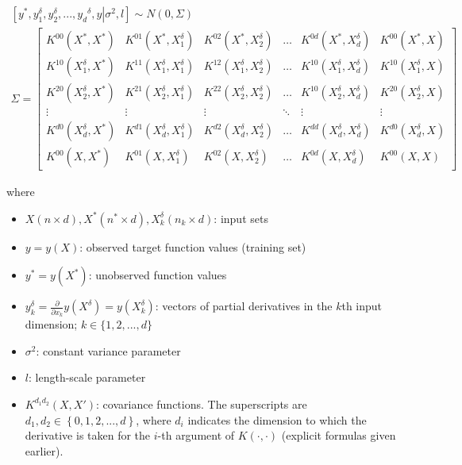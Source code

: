 \documentclass{sfuthesis}
\begin{document}
  \begin{gather}
\left[ {{y^*},y_1^\delta ,y_2^\delta ,...,{y_d}^\delta ,y\left| {{\sigma ^2},l} \right.} \right]\sim N\left( {0,\Sigma } \right) \\
\Sigma  = \left[ {\begin{array}{*{20}{c}}
{{K^{00}}\left( {{X^*},{X^*}} \right)}&{{K^{01}}\left( {{X^*},X_1^\delta } \right)}&{{K^{02}}\left( {{X^*},X_2^\delta } \right)}& \ldots &{{K^{0d}}\left( {{X^*},X_d^\delta } \right)}&{{K^{00}}\left( {{X^*},X} \right)}\\
{{K^{10}}\left( {X_1^\delta ,{X^*}} \right)}&{{K^{11}}\left( {X_1^\delta ,X_1^\delta } \right)}&{{K^{12}}\left( {X_1^\delta ,X_2^\delta } \right)}& \ldots &{{K^{10}}\left( {X_1^\delta ,X_d^\delta } \right)}&{{K^{10}}\left( {X_1^\delta ,X} \right)}\\
{{K^{20}}\left( {X_2^\delta ,{X^*}} \right)}&{{K^{21}}\left( {X_2^\delta ,X_1^\delta } \right)}&{{K^{22}}\left( {X_2^\delta ,X_2^\delta } \right)}& \ldots &{{K^{10}}\left( {X_2^\delta ,X_d^\delta } \right)}&{{K^{20}}\left( {X_2^\delta ,X} \right)}\\
 \vdots & \vdots & \vdots & \ddots & \vdots & \vdots \\
{{K^{d0}}\left( {X_d^\delta ,{X^*}} \right)}&{{K^{d1}}\left( {X_d^\delta ,X_1^\delta } \right)}&{{K^{d2}}\left( {X_d^\delta ,X_2^\delta } \right)}& \ldots &{{K^{dd}}\left( {X_d^\delta ,X_d^\delta } \right)}&{{K^{d0}}\left( {X_d^\delta ,X} \right)}\\
{{K^{00}}\left( {X,{X^*}} \right)}&{{K^{01}}\left( {X,X_1^\delta } \right)}&{{K^{02}}\left( {X,X_2^\delta } \right)}& \ldots &{{K^{0d}}\left( {X,X_d^\delta } \right)}&{{K^{00}}\left( {X,X} \right)}
\end{array}} \right]
  \end{gather}

    where 
    
    \begin{itemize}
        \item $X (n \times d), X^* (n^* \times d), X_k^\delta (n_k \times d)$: input sets
        \item $y = y(X)$: observed target function values (training set) 
        \item $y^* = y(X^*)$: unobserved function values
        \item $y_k^\delta = \frac{\partial }{{\partial {x_k}}}y\left( {{X^\delta }} \right) = y(X_k^\delta)$: vectors of partial derivatives in the $k$th input dimension; $k \in \{ 1, 2, ..., d \}$
        \item $\sigma^2$: constant variance parameter
        \item $l$: length-scale parameter
        \item $K^{d_1 d_2}(X, X')$: covariance functions. The superscripts are $d_1, d_2 \in \left\{ {0,1,2,...,d} \right\}$, where $d_i$ indicates the dimension to which the derivative is taken for the $i$-th argument of $K(\cdot, \cdot)$ (explicit formulas given earlier).
    \end{itemize}
\end{document}
